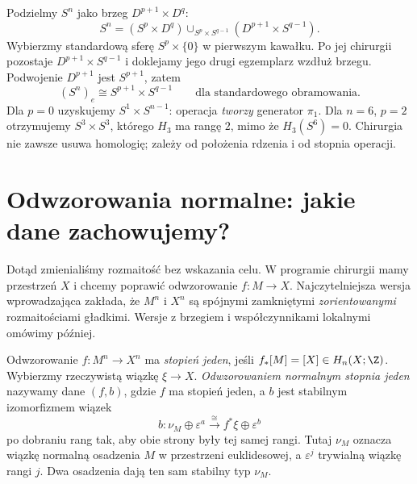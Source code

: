 \begin{przyklad}
\label{prz:sfera-produkt-chirurgia-21}
Podzielmy $S^n$ jako brzeg
$D^{p+1}\times D^q$:
\[
 S^n=(S^p\times D^q)
 \cup_{S^p\times S^{q-1}}
 (D^{p+1}\times S^{q-1}).
\]
Wybierzmy standardową sferę $S^p\times\{0\}$
w pierwszym kawałku. Po jej chirurgii pozostaje
$D^{p+1}\times S^{q-1}$ i doklejamy jego
drugi egzemplarz wzdłuż brzegu.
Podwojenie $D^{p+1}$ jest $S^{p+1}$, zatem
\begin{equation}\label{eq:chirurgia-sfery-21}
 (S^n)_e\cong S^{p+1}\times S^{q-1}
 \qquad\text{dla standardowego obramowania.}
\end{equation}
Dla $p=0$ uzyskujemy $S^1\times S^{n-1}$:
operacja \emph{tworzy} generator $\pi_1$.
Dla $n=6$, $p=2$ otrzymujemy
$S^3\times S^3$, którego $H_3$ ma rangę $2$,
mimo że $H_3(S^6)=0$. Chirurgia nie zawsze
usuwa homologię; zależy od położenia rdzenia
i od stopnia operacji.
\end{przyklad}

\section{Odwzorowania normalne: jakie dane zachowujemy?}
\label{sec:normalne-chirurgia-21}

Dotąd zmienialiśmy rozmaitość bez wskazania celu.
W programie chirurgii mamy przestrzeń $X$ i chcemy
poprawić odwzorowanie $f:M\to X$. Najczytelniejsza
wersja wprowadzająca zakłada, że $M^n$ i $X^n$
są spójnymi zamkniętymi \emph{zorientowanymi}
rozmaitościami gładkimi. Wersje z brzegiem
i współczynnikami lokalnymi omówimy później.

\begin{definicja}
\label{def:normal-map-21}
Odwzorowanie $f:M^n\to X^n$ ma \emph{stopień jeden},
jeśli $f_*[M]=[X]\in H_n(X;\Z)$.
Wybierzmy rzeczywistą wiązkę $\xi\to X$.
\emph{Odwzorowaniem normalnym stopnia jeden}
nazywamy dane $(f,b)$, gdzie $f$ ma stopień jeden,
a $b$ jest stabilnym izomorfizmem wiązek
\begin{equation}\label{eq:normal-map-21}
 b:\nu_M\oplus\varepsilon^a
   \xrightarrow{\ \cong\ }
   f^*\xi\oplus\varepsilon^b
\end{equation}
po dobraniu rang tak, aby obie strony były tej samej
rangi. Tutaj $\nu_M$ oznacza wiązkę normalną
osadzenia $M$ w przestrzeni euklidesowej,
a $\varepsilon^j$ trywialną wiązkę rangi $j$.
Dwa osadzenia dają ten sam stabilny typ $\nu_M$.
\end{definicja}

